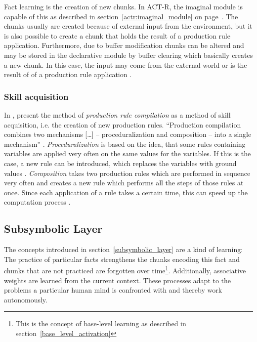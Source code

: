 Fact learning is the creation of new chunks. In ACT-R, the imaginal module is capable of this as described in section~\ref{actr:imaginal_module} on page~\pageref{actr:imaginal_module}. The chunks usually are created because of external input from the environment, but it is also possible to create a chunk that holds the result of a production rule application. Furthermore, due to buffer modification chunks can be altered and may be stored in the declarative module by buffer clearing which basically creates a new chunk. In this case, the input may come from the external world or is the result of of a production rule application \cite[7]{whitehill_understanding}.

\subsubsection{Skill acquisition}

In \cite{taatgen_production_2003}, \citeauthor{taatgen_production_2003} present the method of \emph{production rule compilation} as a method of skill acquisition, i.e. the creation of new production rules. ``Production compilation combines two mechanisms [\dots] -- proceduralization and composition -- into a single mechanism'' \cite[62]{taatgen_production_2003}. \emph{Proceduralization} is based on the idea, that some rules containing variables are applied very often on the same values for the variables. If this is the case, a new rule can be introduced, which replaces the variables with ground values \cite[7]{whitehill_understanding}. \emph{Composition} takes two production rules which are performed in sequence very often and creates a new rule which performs all the steps of those rules at once. Since each application of a rule takes a certain time, this can speed up the computation process \cite[7]{whitehill_understanding}.

\subsection{Subsymbolic Layer}

The concepts introduced in section~\ref{subsymbolic_layer} are a kind of learning: The practice of particular facts strengthens the chunks encoding this fact and chunks that are not practiced are forgotten over time\footnote{This is the concept of base-level learning as described in section~\ref{base_level_activation}}. Additionally, associative weights are learned from the current context. These processes adapt to the problems a particular human mind is confronted with and thereby work autonomously.


